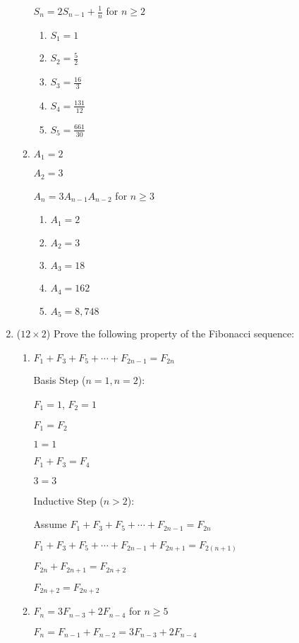 \documentclass[12pt]{article}
\begin{document}
\begin{enumerate}
\begin{enumerate}
		$S_n = 2S_{n-1} + \frac{1}{n}$ for $n \geq 2$

		\begin{enumerate}
			\item $S_1 = 1$
			\item $S_2 = \frac{5}{2}$
			\item $S_3 = \frac{16}{3}$
			\item $S_4 = \frac{131}{12}$
			\item $S_5 = \frac{661}{30}$
		\end{enumerate}
		\item
		$A_1 = 2$

		$A_2 = 3$

		$A_n = 3A_{n-1}A_{n-2}$ for $n \geq 3$

		\begin{enumerate}
			\item $A_1 = 2$
			\item $A_2 = 3$
			\item $A_3 = 18$
			\item $A_4 = 162$
			\item $A_5 = 8,748$
		\end{enumerate}
	\end{enumerate}

	\newpage
	\item ($12 \times 2$)
	Prove the following property of the Fibonacci sequence:

\begin{enumerate}
	\item
	$F_1 + F_3 + F_5 + \cdots + F_{2n-1} = F_{2n}$

	Basis Step ($n = 1, n = 2$):

	$F_1 = 1$, $F_2 = 1$

	$F_1 = F_2$

	$1 = 1$

	$F_1 + F_3 = F_4$

	$3 = 3$

	Inductive Step ($n > 2$):

	Assume $F_1 + F_3 + F_5 + \cdots + F_{2n-1} = F_{2n}$

	$F_1 + F_3 + F_5 + \cdots + F_{2n - 1} + F_{2n + 1} = F_{2(n+1)}$

	$F_{2n} + F_{2n+1} = F_{2n+2}$

	$F_{2n + 2} = F_{2n+2}$
	\newpage
	\item
	$F_n = 3F_{n-3} + 2F_{n-4}$ for $n \geq 5$

	$F_n = F_{n-1} + F_{n-2} = 3F_{n-3} + 2F_{n-4}$


\end{enumerate}
\end{enumerate}
\end{document}
